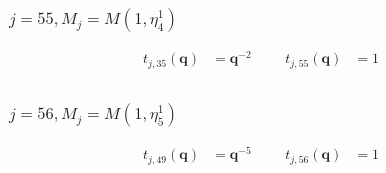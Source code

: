 \subsubsection{$j=55, M_{j}=M(1,\eta^{1}_{4})$}
\begin{align*}
t_{j,35}(\boldsymbol{q})&=\boldsymbol{q}^{-2} &&& t_{j,55}(\boldsymbol{q})&=1 \\
\end{align*}

\subsubsection{$j=56, M_{j}=M(1,\eta^{1}_{5})$}
\begin{align*}
t_{j,49}(\boldsymbol{q})&=\boldsymbol{q}^{-5} &&& t_{j,56}(\boldsymbol{q})&=1 \\
\end{align*}

